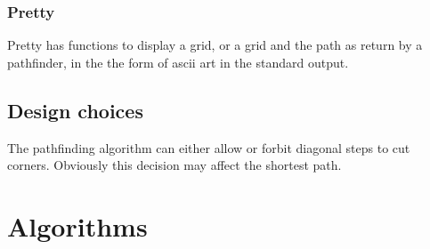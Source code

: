 \documentclass[12pt, a4paper]{article}
\begin{document}
\subsubsection{Pretty}
Pretty has functions to display a grid, or a grid and the path as return by a pathfinder, in the the form of ascii art in the standard output.






\subsection{Design choices}







The pathfinding algorithm can either allow or forbit diagonal steps to cut
corners. Obviously this decision may affect the shortest path. \cite{astar2}



\section{Algorithms}
\label{Algorithms}
\end{document}
